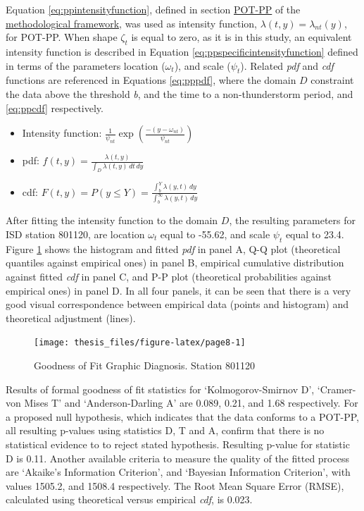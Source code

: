 \documentclass[12pt,oneside]{reedthesis}
\begin{document}
Equation \eqref{eq:ppintensityfunction}, defined in section \protect\hyperlink{method-pot-pp}{POT-PP} of the \protect\hyperlink{rmd-thefra}{methodological framework}, was used as intensity function, \(\lambda(t, y) = \lambda_{nt}(y)\), for POT-PP. When shape \(\zeta_t\) is equal to zero, as it is in this study, an equivalent intensity function is described in Equation \eqref{eq:ppspecificintensityfunction} defined in terms of the parameters location (\(\omega_t\)), and scale (\(\psi_t\)). Related \emph{pdf} and \emph{cdf} functions are referenced in Equations \eqref{eq:pppdf}, where the domain \(D\) constraint the data above the threshold \emph{b}, and the time to a non-thunderstorm period, and \eqref{eq:ppcdf} respectively.
\begin{itemize}
\item
  Intensity function: \(\frac{1}{\psi_{nt}}\exp\left(\frac{-(y-\omega_{nt})}{\psi_{nt}}\right)\)
\item
  pdf: \(f(t,y) = \frac{\lambda(t,y)}{\int_D\lambda(t,y)\,dt\,dy}\)
\item
  cdf: \(F(t,y) = P(y \leq Y) = \frac{\int_b^Y\lambda(y,t)\,dy}{\int_b^\infty\lambda(y,t)\,dy}\)
\end{itemize}
After fitting the intensity function to the domain \(D\), the resulting parameters for ISD station 801120, are location \(\omega_t\) equal to -55.62, and scale \(\psi_t\) equal to 23.4. Figure \ref{fig:page8} shows the histogram and fitted \emph{pdf} in panel A, Q-Q plot (theoretical quantiles against empirical ones) in panel B, empirical cumulative distribution against fitted \emph{cdf} in panel C, and P-P plot (theoretical probabilities against empirical ones) in panel D. In all four panels, it can be seen that there is a very good visual correspondence between empirical data (points and histogram) and theoretical adjustment (lines).
\begin{figure}

{\centering \texttt{[image: thesis\_files/figure-latex/page8-1]} 

}

\caption{Goodness of Fit Graphic Diagnosis. Station 801120}\label{fig:page8}
\end{figure}
Results of formal goodness of fit statistics for `Kolmogorov-Smirnov D', `Cramer-von Mises T' and `Anderson-Darling A' are 0.089, 0.21, and 1.68 respectively. For a proposed null hypothesis, which indicates that the data conforms to a POT-PP, all resulting p-values using statistics D, T and A, confirm that there is no statistical evidence to to reject stated hypothesis. Resulting p-value for statistic D is 0.11. Another available criteria to measure the quality of the fitted process are `Akaike's Information Criterion', and `Bayesian Information Criterion', with values 1505.2, and 1508.4 respectively. The Root Mean Square Error (RMSE), calculated using theoretical versus empirical \emph{cdf}, is 0.023.
\end{document}
